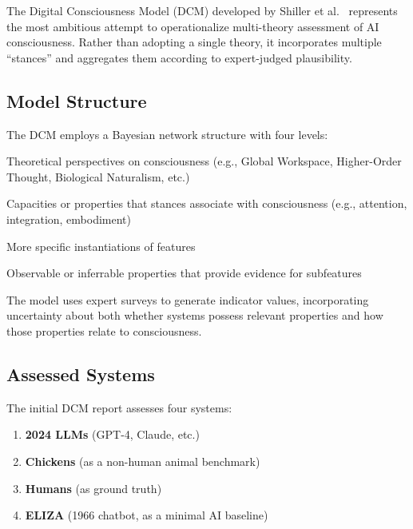 The Digital Consciousness Model (DCM) developed by Shiller et al.~\citep{shiller2026dcm} represents the most ambitious attempt to operationalize multi-theory assessment of AI consciousness. Rather than adopting a single theory, it incorporates multiple ``stances'' and aggregates them according to expert-judged plausibility.

\subsection{Model Structure}

The DCM employs a Bayesian network structure with four levels:

\begin{description}[leftmargin=*]
    \item[Stances:] Theoretical perspectives on consciousness (e.g., Global Workspace, Higher-Order Thought, Biological Naturalism, etc.)

    \item[Features:] Capacities or properties that stances associate with consciousness (e.g., attention, integration, embodiment)

    \item[Subfeatures:] More specific instantiations of features

    \item[Indicators:] Observable or inferrable properties that provide evidence for subfeatures
\end{description}

The model uses expert surveys to generate indicator values, incorporating uncertainty about both whether systems possess relevant properties and how those properties relate to consciousness.

\subsection{Assessed Systems}

The initial DCM report assesses four systems:

\begin{enumerate}
    \item \textbf{2024 LLMs} (GPT-4, Claude, etc.)
    \item \textbf{Chickens} (as a non-human animal benchmark)
    \item \textbf{Humans} (as ground truth)
    \item \textbf{ELIZA} (1966 chatbot, as a minimal AI baseline)
\end{enumerate}

